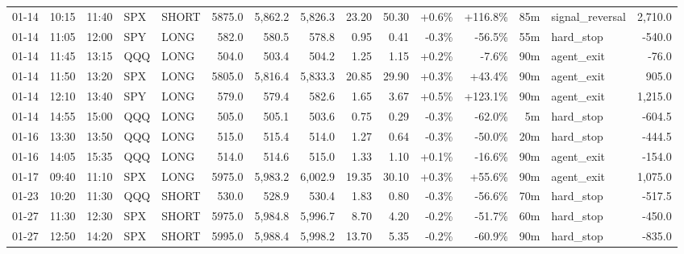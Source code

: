 \documentclass[11pt,a4paper,twoside]{article}
\begin{document}
\begin{landscape}
\begin{center}
\begin{longtable}{>{\color{txtmain}}l l l l l r r r r r r r r >{\color{txtmain}}l r}
01-14 & 10:15 & 11:40 & SPX & SHORT & 5875.0 & 5,862.2 & 5,826.3 & 23.20 & 50.30 & \textcolor{wingreen}{+0.6\%} & \textcolor{wingreen}{+116.8\%} & 85m & signal\_reversal & \textcolor{wingreen}{2,710.0} \\
01-14 & 11:05 & 12:00 & SPY & LONG & 582.0 & 580.5 & 578.8 & 0.95 & 0.41 & \textcolor{lossred}{-0.3\%} & \textcolor{lossred}{-56.5\%} & 55m & hard\_stop & \textcolor{lossred}{-540.0} \\
01-14 & 11:45 & 13:15 & QQQ & LONG & 504.0 & 503.4 & 504.2 & 1.25 & 1.15 & \textcolor{wingreen}{+0.2\%} & \textcolor{lossred}{-7.6\%} & 90m & agent\_exit & \textcolor{lossred}{-76.0} \\
01-14 & 11:50 & 13:20 & SPX & LONG & 5805.0 & 5,816.4 & 5,833.3 & 20.85 & 29.90 & \textcolor{wingreen}{+0.3\%} & \textcolor{wingreen}{+43.4\%} & 90m & agent\_exit & \textcolor{wingreen}{905.0} \\
01-14 & 12:10 & 13:40 & SPY & LONG & 579.0 & 579.4 & 582.6 & 1.65 & 3.67 & \textcolor{wingreen}{+0.5\%} & \textcolor{wingreen}{+123.1\%} & 90m & agent\_exit & \textcolor{wingreen}{1,215.0} \\
01-14 & 14:55 & 15:00 & QQQ & LONG & 505.0 & 505.1 & 503.6 & 0.75 & 0.29 & \textcolor{lossred}{-0.3\%} & \textcolor{lossred}{-62.0\%} & 5m & hard\_stop & \textcolor{lossred}{-604.5} \\
01-16 & 13:30 & 13:50 & QQQ & LONG & 515.0 & 515.4 & 514.0 & 1.27 & 0.64 & \textcolor{lossred}{-0.3\%} & \textcolor{lossred}{-50.0\%} & 20m & hard\_stop & \textcolor{lossred}{-444.5} \\
01-16 & 14:05 & 15:35 & QQQ & LONG & 514.0 & 514.6 & 515.0 & 1.33 & 1.10 & \textcolor{wingreen}{+0.1\%} & \textcolor{lossred}{-16.6\%} & 90m & agent\_exit & \textcolor{lossred}{-154.0} \\
01-17 & 09:40 & 11:10 & SPX & LONG & 5975.0 & 5,983.2 & 6,002.9 & 19.35 & 30.10 & \textcolor{wingreen}{+0.3\%} & \textcolor{wingreen}{+55.6\%} & 90m & agent\_exit & \textcolor{wingreen}{1,075.0} \\
01-23 & 10:20 & 11:30 & QQQ & SHORT & 530.0 & 528.9 & 530.4 & 1.83 & 0.80 & \textcolor{lossred}{-0.3\%} & \textcolor{lossred}{-56.6\%} & 70m & hard\_stop & \textcolor{lossred}{-517.5} \\
01-27 & 11:30 & 12:30 & SPX & SHORT & 5975.0 & 5,984.8 & 5,996.7 & 8.70 & 4.20 & \textcolor{lossred}{-0.2\%} & \textcolor{lossred}{-51.7\%} & 60m & hard\_stop & \textcolor{lossred}{-450.0} \\
01-27 & 12:50 & 14:20 & SPX & SHORT & 5995.0 & 5,988.4 & 5,998.2 & 13.70 & 5.35 & \textcolor{lossred}{-0.2\%} & \textcolor{lossred}{-60.9\%} & 90m & hard\_stop & \textcolor{lossred}{-835.0} \\

\end{longtable}
\end{center}
\end{landscape}
\end{document}
